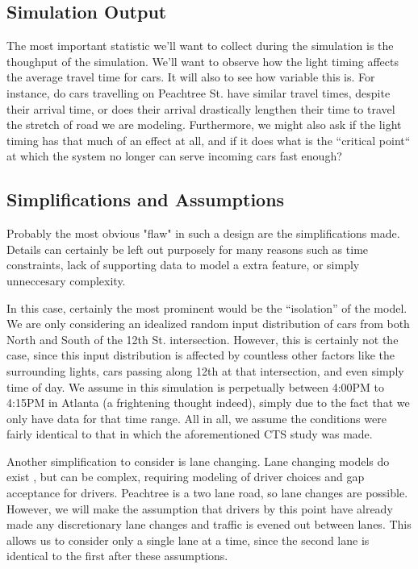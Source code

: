 \documentclass[a4paper,12pt]{article}
\begin{document}
\subsection{Simulation Output}
The most important statistic we'll want to collect during the simulation is the thoughput of the simulation. We'll
want to observe how the light timing affects the average travel time for cars. It will also to see how variable this
is. For instance, do cars travelling on Peachtree St. have similar travel times, despite their arrival time, or does
their arrival drastically lengthen their time to travel the stretch of road we are modeling. Furthermore, we might also
ask if the light timing has that much of an effect at all, and if it does what is the ``critical point`` at which the
system no longer can serve incoming cars fast enough?

\subsection{Simplifications and Assumptions}
Probably the most obvious "flaw" in such a design are the simplifications made. Details can certainly be left out
purposely for many reasons such as time constraints, lack of supporting data to model a extra feature, or simply
unneccesary complexity.

In this case, certainly the most prominent would be the ``isolation'' of the model. We are only considering an
idealized random input distribution of cars from both North and South of the 12th St. intersection. However, this is
certainly not the case, since this input distribution is affected by countless other factors like the surrounding
lights, cars passing along 12th at that intersection, and even simply time of day. We assume in this simulation is
perpetually between 4:00PM to 4:15PM in Atlanta (a frightening thought indeed), simply due to the fact that we only
have data for that time range. All in all, we assume the conditions were fairly identical to that in which the 
aforementioned CTS study was made.

Another simplification to consider is lane changing. Lane changing models do exist \cite{lanechanging} \cite{lanechanging2},
but can be complex, requiring modeling of driver choices and gap acceptance for drivers. Peachtree is a two lane road,
so lane changes are possible. However, we will make the assumption that drivers by this point have already made any
discretionary lane changes and traffic is evened out between lanes. This allows us to consider only a single lane at a
time, since the second lane is identical to the first after these assumptions.
\end{document}
